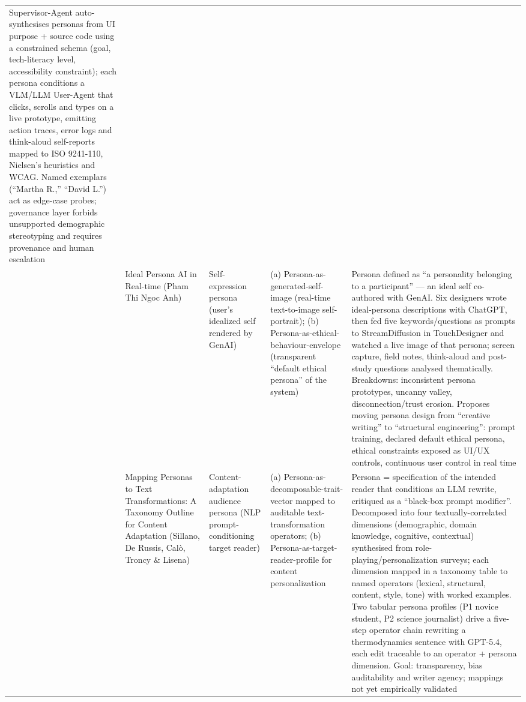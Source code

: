 \begin{table}[t]
\begin{tabular}{p{0.5cm} p{3.6cm} p{3.4cm} p{3.6cm} p{3.6cm}}
Supervisor-Agent auto-synthesises personas from UI purpose + source code using a constrained schema (goal, tech-literacy level, accessibility constraint); each persona conditions a VLM/LLM User-Agent that clicks, scrolls and types on a live prototype, emitting action traces, error logs and think-aloud self-reports mapped to ISO 9241-110, Nielsen's heuristics and WCAG. Named exemplars (``Martha R.,'' ``David L.'') act as edge-case probes; governance layer forbids unsupported demographic stereotyping and requires provenance and human escalation \\
\addlinespace
5 & Ideal Persona AI in Real-time (Pham Thi Ngoc Anh) &
Self-expression persona (user's idealized self rendered by GenAI) &
(a) Persona-as-generated-self-image (real-time text-to-image self-portrait); (b) Persona-as-ethical-behaviour-envelope (transparent ``default ethical persona'' of the system) &
Persona defined as ``a personality belonging to a participant'' --- an ideal self co-authored with GenAI. Six designers wrote ideal-persona descriptions with ChatGPT, then fed five keywords/questions as prompts to StreamDiffusion in TouchDesigner and watched a live image of that persona; screen capture, field notes, think-aloud and post-study questions analysed thematically. Breakdowns: inconsistent persona prototypes, uncanny valley, disconnection/trust erosion. Proposes moving persona design from ``creative writing'' to ``structural engineering'': prompt training, declared default ethical persona, ethical constraints exposed as UI/UX controls, continuous user control in real time \\
\addlinespace
6 & Mapping Personas to Text Transformations: A Taxonomy Outline for Content Adaptation (Sillano, De Russis, Cal\`o, Troncy \& Lisena) &
Content-adaptation audience persona (NLP prompt-conditioning target reader) &
(a) Persona-as-decomposable-trait-vector mapped to auditable text-transformation operators; (b) Persona-as-target-reader-profile for content personalization &
Persona = specification of the intended reader that conditions an LLM rewrite, critiqued as a ``black-box prompt modifier''. Decomposed into four textually-correlated dimensions (demographic, domain knowledge, cognitive, contextual) synthesised from role-playing/personalization surveys; each dimension mapped in a taxonomy table to named operators (lexical, structural, content, style, tone) with worked examples. Two tabular persona profiles (P1 novice student, P2 science journalist) drive a five-step operator chain rewriting a thermodynamics sentence with GPT-5.4, each edit traceable to an operator + persona dimension. Goal: transparency, bias auditability and writer agency; mappings not yet empirically validated \\

\end{tabular}
\end{table}
